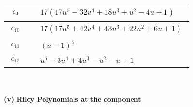 \documentclass[1p]{elsarticle_modified}
\theoremstyle{definition}
\begin{document}
\begin{tabular}{m{50pt}|m{274pt}}
\hline $$\begin{aligned}c_{9}\end{aligned}$$&$\begin{aligned}
&17(17 u^5-32 u^4+18 u^3+u^2-4 u+1)
\end{aligned}$\\
\hline $$\begin{aligned}c_{10}\end{aligned}$$&$\begin{aligned}
&17(17 u^5+42 u^4+43 u^3+22 u^2+6 u+1)
\end{aligned}$\\
\hline $$\begin{aligned}c_{11}\end{aligned}$$&$\begin{aligned}
&(u-1)^5
\end{aligned}$\\
\hline $$\begin{aligned}c_{12}\end{aligned}$$&$\begin{aligned}
&u^5-3 u^4+4 u^3- u^2- u+1
\end{aligned}$\\
\hline
\end{tabular}\\~\\
\newpage\renewcommand{\arraystretch}{1}
\flushleft \textbf{(v) Riley Polynomials at the component}\newline \\
\end{document}
